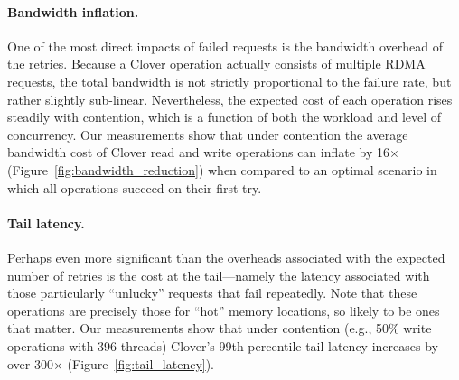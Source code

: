 \paragraph{Bandwidth inflation.} 

One of the most direct impacts of failed requests is the bandwidth
overhead of the retries.  Because a Clover operation actually
consists of multiple RDMA requests, the total bandwidth is not
strictly proportional to the failure rate, but rather slightly
sub-linear.  Nevertheless, the expected cost of each operation rises
steadily with contention, which is a function of both the workload and
level of concurrency.  Our measurements show that under contention the
average bandwidth cost of Clover read and write operations can inflate
by 16$\times$ (Figure~\ref{fig:bandwidth_reduction}) when compared
to an optimal scenario in which all operations succeed on their first
try.

\paragraph{Tail latency.}

Perhaps even more significant than the overheads associated with the expected
number of retries is the cost at the tail---namely the latency associated with
those particularly ``unlucky'' requests that fail repeatedly.  Note that these
operations are precisely those for ``hot'' memory locations, so likely to be
ones that matter.  Our measurements show that under contention (e.g., 50\% write
operations with 396 threads) Clover's 99th-percentile tail latency increases by
over 300$\times$ (Figure~\ref{fig:tail_latency}).


